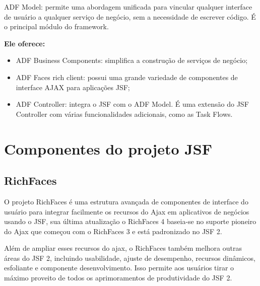 \documentclass[12pt,a4paper]{article}
\begin{document}
ADF Model: permite uma abordagem unificada para vincular qualquer interface de usuário a qualquer serviço de negócio, sem a necessidade de escrever código. É o principal módulo do framework.

\textbf{Ele oferece:}
\begin{itemize}
\item ADF Business Components: simplifica a construção de serviços de negócio;

\item ADF Faces rich client: possui uma grande variedade de componentes de interface AJAX para aplicações JSF;

\item ADF Controller: integra o JSF com o ADF Model. É uma extensão do JSF Controller com várias funcionalidades adicionais, como as Task Flows.
\end{itemize}

\section{Componentes do projeto JSF}
\subsection{RichFaces}
O projeto RichFaces é uma estrutura avançada de componentes de interface do usuário para integrar facilmente os recursos do Ajax em aplicativos de negócios usando o JSF, sua última atualização o RichFaces 4 baseia-se no suporte pioneiro do Ajax que começou com o RichFaces 3 e está padronizado no JSF 2.

Além de ampliar esses recursos do ajax, o RichFaces também melhora outras áreas do JSF 2, incluindo usabilidade, ajuste de desempenho, recursos dinâmicos, esfoliante e componente desenvolvimento. Isso permite aos usuários tirar o máximo proveito de todos os aprimoramentos de produtividade do JSF 2. 
\end{document}
